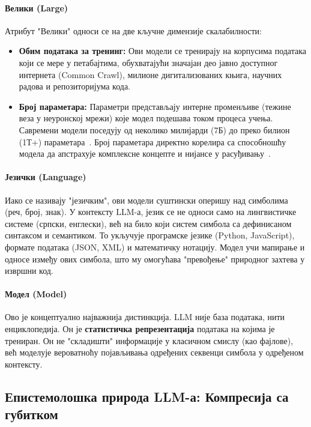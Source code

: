 \paragraph{Велики (Large)}
Атрибут "Велики" односи се на две кључне димензије скалабилности:
\begin{itemize}
    \item \textbf{Обим података за тренинг:} Ови модели се тренирају на корпусима података који се мере у петабајтима, обухватајући значајан део јавно доступног интернета (Common Crawl), милионе дигитализованих књига, научних радова и репозиторијума кода.
    \item \textbf{Број параметара:} Параметри представљају интерне променљиве (тежине веза у неуронској мрежи) које модел подешава током процеса учења. Савремени модели поседују од неколико милијарди (7Б) до преко билион (1Т+) параметара~\cite{kaplan2020scaling,fedus2022switch,hoffmann2022chinchilla}. Број параметара директно корелира са способношћу модела да апстрахује комплексне концепте и нијансе у расуђивању~\cite{wei2022emergent,hendrycks2021mmlu}.
\end{itemize}

\paragraph{Језички (Language)}
Иако се називају "језичким", ови модели суштински оперишу над симболима (реч, број, знак). У контексту LLM-а, језик се не односи само на лингвистичке системе (српски, енглески), већ на било који систем симбола са дефинисаном синтаксом и семантиком. То укључује програмске језике (Python, JavaScript), формате података (JSON, XML) и математичку нотацију. Модел учи мапирање и односе између ових симбола, што му омогућава "превођење" природног захтева у извршни код.

\paragraph{Модел (Model)}
Ово је концептуално најважнија дистинкција. LLM није база података, нити енциклопедија. Он је \textbf{статистичка репрезентација} података на којима је трениран. Он не "складишти" информације у класичном смислу (као фајлове), већ моделује вероватноћу појављивања одређених секвенци симбола у одређеном контексту.

\subsection{Епистемолошка природа LLM-а: Компресија са губитком}

